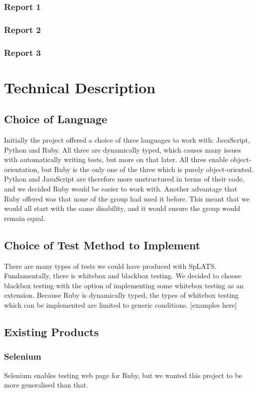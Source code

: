 \documentclass{report}
\begin{document}
\subsection{Report 1}
\subsection{Report 2}
\subsection{Report 3}

\chapter{Technical Description}
\section{Choice of Language}
Initially the project offered a choice of three languages to work with: JavaScript, Python and Ruby. All three are dynamically typed, which causes many issues with automatically writing tests, but more on that later. All three enable object-orientation, but Ruby is the only one of the three which is purely object-oriented. Python and JavaScript are therefore more unstructured in terms of their code, and we decided Ruby would be easier to work with. Another advantage that Ruby offered was that none of the group had used it before. This meant that we would all start with the same disability, and it would ensure the group would remain equal.

\section{Choice of Test Method to Implement}
There are many types of tests we could have produced with SpLATS. Fundamentally, there is whitebox and blackbox testing. We decided to choose blackbox testing with the option of implementing some whitebox testing as an extension. Because Ruby is dynamically typed, the types of whitebox testing which can be implemented are limited to generic conditions. [examples here]

\section{Existing Products}
\subsection{Selenium}
Selenium enables testing web page for Ruby, but we wanted this project to be more generalised than that.
\end{document}
